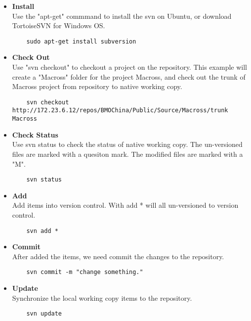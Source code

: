 \documentclass{article}
\begin{document}
\begin{itemize}
\item
	\textbf{Install}\\
	Use the "apt-get" commmand to install the svn on Ubuntu, or download TortoiseSVN for Windows OS.
	\begin{lstlisting}
	sudo apt-get install subversion	
	\end{lstlisting}

\item
	\textbf{Check Out}\\
	Use "svn checkout" to checkout a project on the repository. This example will create a "Macross" folder for the project Macross, and check out the trunk of Macross project from repository to native working copy.
	\begin{lstlisting}
	svn checkout http://172.23.6.12/repos/BMOChina/Public/Source/Macross/trunk Macross
	\end{lstlisting}

\item
	\textbf{Check Status}\\
	Use svn status to check the status of native working copy. The un-versioned files are marked with a quesiton mark. The modified files are marked with a "M".
	\begin{lstlisting}
	svn status
	\end{lstlisting}

\item
	\textbf{Add}\\
	Add items into version control. With add * will all un-versioned to version control.
	\begin{lstlisting}
	svn add *
	\end{lstlisting}	

\item
	\textbf{Commit}\\
	After added the items, we need commit the changes to the repository.
	\begin{lstlisting}
	svn commit -m "change something."
	\end{lstlisting}

\item
	\textbf{Update}\\
	Synchronize the local working copy items to the repository.
	\begin{lstlisting}
	svn update
	\end{lstlisting}

\end{itemize}
\end{document}
